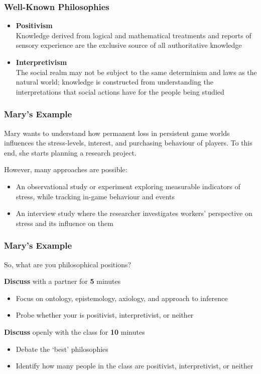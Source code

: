 \begin{frame}
	\frametitle{Well-Known Philosophies}
	\begin{itemize}
		\item \textbf{Positivism} \\
		Knowledge derived from logical and mathematical treatments and reports of sensory experience are the exclusive source of all authoritative knowledge
		\item \textbf{Interpretivism} \\
		The social realm may not be subject to the same determinism and laws as the natural world; knowledge is constructed from understanding the interpretations that social actions have for the people being studied
	\end{itemize}
\end{frame}

\begin{frame}
	\frametitle{Mary's Example}
	
	Mary wants to understand how permanent loss in persistent game worlds influences the stress-levels, interest, and purchasing behaviour of players. 
	To this end, she starts planning a research project.
	
	\vspace{1em}
	
	However, many approaches are possible:
	
	\begin{itemize}
		\item An observational study or experiment exploring measurable indicators of stress, while tracking in-game behaviour and events
		\item An interview study where the researcher investigates workers’ perspective on stress and its influence on them
	\end{itemize}
\end{frame}

\begin{frame}
	\frametitle{Mary's Example}
	
	So, what are you philosophical positions?
	
	\vspace{1em}
	
	\textbf{Discuss} with a partner for \textbf{5} minutes
	
	\begin{itemize}
		\item Focus on ontology, epistemology, axiology, and approach to inference
		\item Probe whether your is positivist, interpretivist, or neither
	\end{itemize}
	
	\textbf{Discuss} openly with the class for \textbf{10} minutes
	
	\begin{itemize}
		\item Debate the `best' philosophies
		\item Identify how many people in the class are positivist, interpretivist, or neither
	\end{itemize}
\end{frame}


